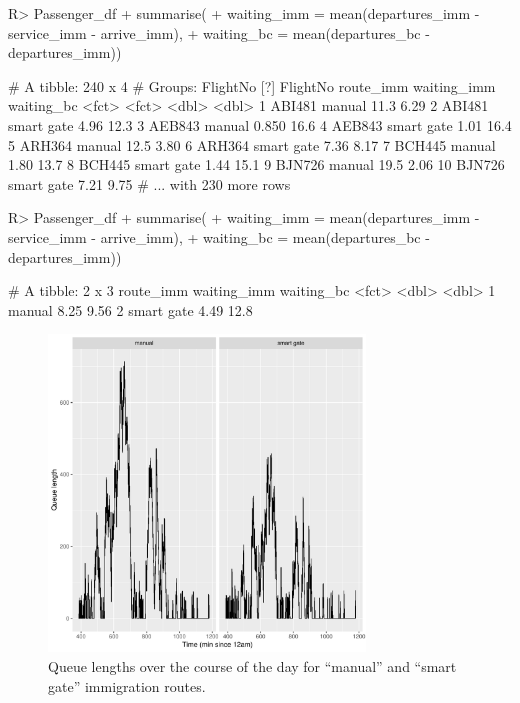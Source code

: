 \documentclass[article]{jss}
\begin{document}
\begin{CodeChunk}
\begin{Sinput}
R> Passenger_df %
+    summarise(
+      waiting_imm = mean(departures_imm - service_imm - arrive_imm), 
+      waiting_bc = mean(departures_bc - departures_imm))
\end{Sinput}
\begin{Soutput}
# A tibble: 240 x 4
# Groups:   FlightNo [?]
   FlightNo route_imm  waiting_imm waiting_bc
   <fct>    <fct>            <dbl>      <dbl>
 1 ABI481   manual          11.3         6.29
 2 ABI481   smart gate       4.96       12.3 
 3 AEB843   manual           0.850      16.6 
 4 AEB843   smart gate       1.01       16.4 
 5 ARH364   manual          12.5         3.80
 6 ARH364   smart gate       7.36        8.17
 7 BCH445   manual           1.80       13.7 
 8 BCH445   smart gate       1.44       15.1 
 9 BJN726   manual          19.5         2.06
10 BJN726   smart gate       7.21        9.75
# ... with 230 more rows
\end{Soutput}
\begin{Sinput}
R> Passenger_df %
+    summarise(
+      waiting_imm = mean(departures_imm - service_imm - arrive_imm), 
+      waiting_bc = mean(departures_bc - departures_imm))
\end{Sinput}
\begin{Soutput}
# A tibble: 2 x 3
  route_imm  waiting_imm waiting_bc
  <fct>            <dbl>      <dbl>
1 manual            8.25       9.56
2 smart gate        4.49      12.8
\end{Soutput}
\end{CodeChunk}
%
\begin{figure}[t!]
\centering
\includegraphics[width = 0.75\textwidth, trim = 0 5 0 5, clip]{queuelength_dplyr.pdf}
\caption{Queue lengths over the course of the day for ``manual'' and
  ``smart gate'' immigration routes. }
\label{fig:queuelength_dplyr}
\end{figure}
\end{document}
